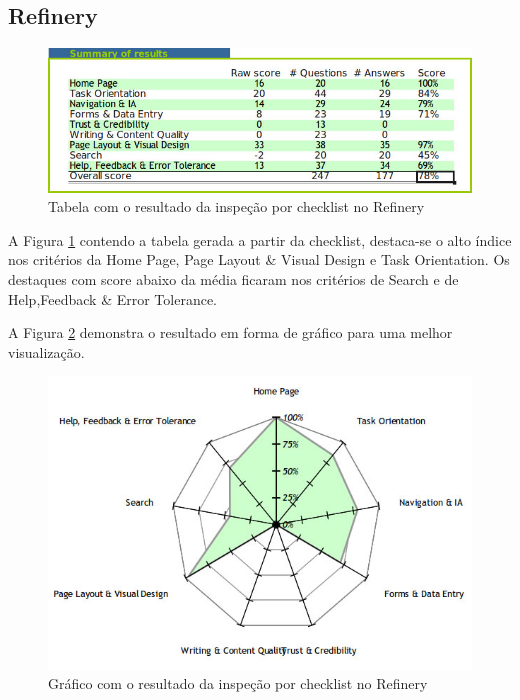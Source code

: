 \subsection{Refinery}

\begin{figure}[here]
\includegraphics[width=130mm]{images/refinery_result_checklist_table.jpg}
\caption{Tabela com o resultado da inspeção por checklist no Refinery}
\label{fig:resultado_checklist_refinery_tabela}
\end{figure}

A Figura \ref{fig:resultado_checklist_refinery_tabela} contendo a tabela gerada a partir da checklist, destaca-se o alto índice nos critérios da Home Page, Page Layout \& Visual Design e Task Orientation. Os destaques com score abaixo da média ficaram nos critérios de Search e de Help,Feedback \& Error Tolerance. 

A Figura \ref{fig:resultado_checklist_refinery_grafico} demonstra o resultado em forma de gráfico para uma melhor visualização.

\begin{figure}[here]
\includegraphics[scale=0.5]{images/refinery_result_checklist_graph.jpg}
\caption{Gráfico com o resultado da inspeção por checklist no Refinery}
\label{fig:resultado_checklist_refinery_grafico}
\end{figure}

